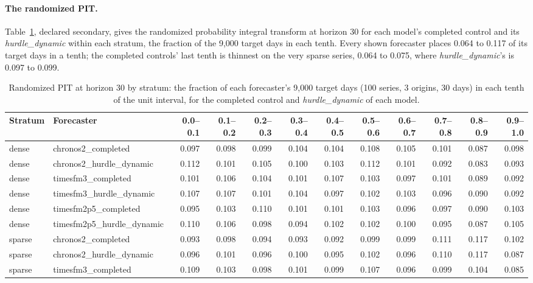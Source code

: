 \paragraph{The randomized PIT.} Table~\ref{tab:s3pit}, declared secondary, gives the randomized
probability integral transform at horizon 30 for each model's completed control and its \emph{hurdle\_dynamic} within each stratum, the
fraction of the 9,000 target days in each tenth. Every shown forecaster places 0.064 to 0.117 of its target
days in a tenth; the completed controls' last tenth is thinnest on the very sparse series, 0.064 to 0.075,
where \emph{hurdle\_dynamic}'s is 0.097 to 0.099.

\begin{table}[htbp]
\centering\scriptsize\setlength{\tabcolsep}{2.4pt}
\caption{Randomized PIT at horizon 30 by stratum: the fraction of each forecaster's 9,000 target days (100
series, 3 origins, 30 days) in each tenth of the unit interval, for the completed control and
\emph{hurdle\_dynamic} of each model.}
\label{tab:s3pit}
\begin{tabular}{llrrrrrrrrrr}
\toprule
Stratum & Forecaster & 0.0--0.1 & 0.1--0.2 & 0.2--0.3 & 0.3--0.4 & 0.4--0.5 & 0.5--0.6 & 0.6--0.7 & 0.7--0.8 & 0.8--0.9 & 0.9--1.0 \\
\midrule
dense & chronos2\_completed & 0.097 & 0.098 & 0.099 & 0.104 & 0.104 & 0.108 & 0.105 & 0.101 & 0.087 & 0.098 \\
dense & chronos2\_hurdle\_dynamic & 0.112 & 0.101 & 0.105 & 0.100 & 0.103 & 0.112 & 0.101 & 0.092 & 0.083 & 0.093 \\
dense & timesfm3\_completed & 0.101 & 0.106 & 0.104 & 0.101 & 0.107 & 0.103 & 0.097 & 0.101 & 0.089 & 0.092 \\
dense & timesfm3\_hurdle\_dynamic & 0.107 & 0.107 & 0.101 & 0.104 & 0.097 & 0.102 & 0.103 & 0.096 & 0.090 & 0.092 \\
dense & timesfm2p5\_completed & 0.095 & 0.103 & 0.110 & 0.101 & 0.101 & 0.103 & 0.096 & 0.097 & 0.090 & 0.103 \\
dense & timesfm2p5\_hurdle\_dynamic & 0.110 & 0.106 & 0.098 & 0.094 & 0.102 & 0.102 & 0.100 & 0.095 & 0.087 & 0.105 \\
sparse & chronos2\_completed & 0.093 & 0.098 & 0.094 & 0.093 & 0.092 & 0.099 & 0.099 & 0.111 & 0.117 & 0.102 \\
sparse & chronos2\_hurdle\_dynamic & 0.096 & 0.101 & 0.096 & 0.100 & 0.095 & 0.102 & 0.096 & 0.110 & 0.117 & 0.087 \\
sparse & timesfm3\_completed & 0.109 & 0.103 & 0.098 & 0.101 & 0.099 & 0.107 & 0.096 & 0.099 & 0.104 & 0.085 \\

\end{tabular}
\end{table}

